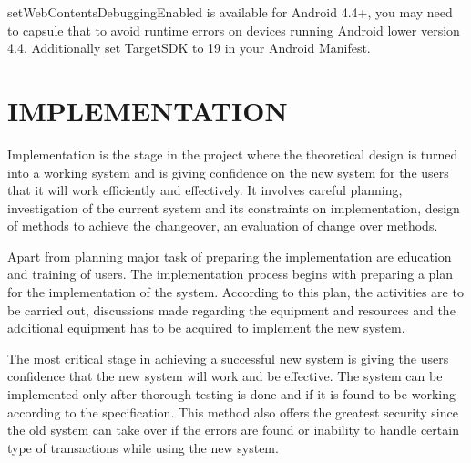 \documentclass{article}
\begin{document}
\par setWebContentsDebuggingEnabled is available for Android 4.4+, you may need to capsule that to avoid runtime errors on devices running Android lower version 4.4. Additionally set TargetSDK to 19 in your Android Manifest.





\newpage
\section{IMPLEMENTATION}
\par Implementation is the stage in the project where the theoretical design is turned into a working system and is giving confidence on the new system for the users that it will work efficiently and effectively. It involves careful planning, investigation of the current system and its constraints on implementation, design of methods to achieve the changeover, an evaluation of change over methods.
\par  Apart from planning major task of preparing the implementation are education and training of users. The implementation process begins with preparing a plan for the implementation of the system. According to this plan, the activities are to be carried out, discussions made regarding the equipment and resources and the additional equipment has to be acquired to implement the new system.
\par  The most critical stage in achieving a successful new system is giving the users confidence that the new system will work and be effective. The system can be implemented only after thorough testing is done and if it is found to be working according to the specification. This method also offers the greatest security since the old system can take over if the errors are found or inability to handle certain type of transactions while using the new system.
\end{document}
